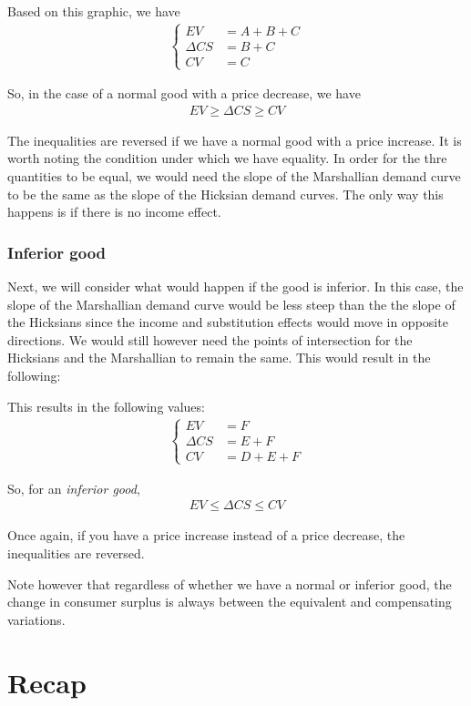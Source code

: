 Based on this graphic, we have
\begin{align*}
    \begin{cases}
        EV &= A + B + C \\
        \Delta CS &= B + C \\
        CV &= C
    \end{cases}
\end{align*}

So, in the case of a normal good with a price decrease, we have
\begin{align*}
    EV \geq \Delta CS \geq CV
\end{align*}

The inequalities are reversed if we have a normal good with a price increase. It is worth noting the condition under which we have equality. In order for the thre quantities to be equal, we would need the slope of the Marshallian demand curve to be the same as the slope of the Hicksian demand curves. The only way this happens is if there is no income effect.

\subsubsection*{Inferior good}
Next, we will consider what would happen if the good is inferior. In this case, the slope of the Marshallian demand curve would be less steep than the the slope of the Hicksians since the income and substitution effects would move in opposite directions. We would still however need the points of intersection for the Hicksians and the Marshallian to remain the same. This would result in the following:

This results in the following values:
\begin{align*}
    \begin{cases}
        EV &= F \\
        \Delta CS &= E + F \\
        CV &= D + E + F
    \end{cases}
\end{align*}

So, for an \emph{inferior good}, 
\begin{align*}
    EV \leq \Delta CS \leq CV
\end{align*}

Once again, if you have a price increase instead of a price decrease, the inequalities are reversed. 

Note however that regardless of whether we have a normal or inferior good, the change in consumer surplus is always between the equivalent and compensating variations. 

\section*{Recap}